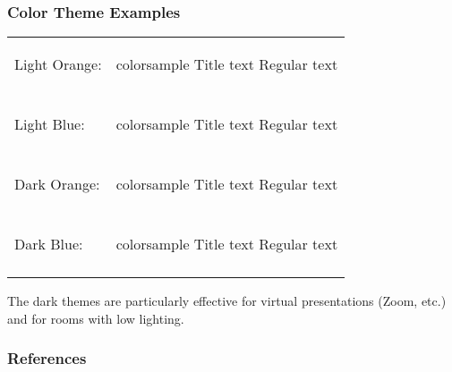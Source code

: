 \documentclass[10pt, aspectratio=169]{oden_beamer}
\begin{document}
\begin{frame} %
\frametitle{Color Theme Examples}

\begin{center}
\begin{tabular}{lr}
    Light Orange: &
        \setbeamercolor{colorsample}{bg=white,fg=charcoal}
        \begin{beamercolorbox}[wd=5cm,ht=.5cm,dp=.25cm,center]{colorsample}
            \textcolor{burnt_orange}{Title text} Regular text
        \end{beamercolorbox}
    \\ \\
    Light Blue: &
        \setbeamercolor{colorsample}{bg=white,fg=charcoal}
        \begin{beamercolorbox}[wd=5cm,ht=.5cm,dp=.25cm,center]{colorsample}
            \textcolor{oden_blue_dark}{Title text} Regular text
        \end{beamercolorbox}
    \\ \\
    Dark Orange: &
        \setbeamercolor{colorsample}{bg=charcoal,fg=chalk}
        \begin{beamercolorbox}[wd=5cm,ht=.5cm,dp=.25cm,center]{colorsample}
            \textcolor{accent_orange}{Title text} Regular text
        \end{beamercolorbox}
    \\ \\
    Dark Blue: &
        \setbeamercolor{colorsample}{bg=charcoal,fg=chalk}
        \begin{beamercolorbox}[wd=5cm,ht=.5cm,dp=.25cm,center]{colorsample}
            \textcolor{oden_blue}{Title text} Regular text
        \end{beamercolorbox}
    \\ \\
\end{tabular}
\end{center}

The dark themes are particularly effective for virtual presentations (Zoom, etc.) and for rooms with low lighting.
\end{frame}

\begin{frame}[allowframebreaks]
    \frametitle{References}
    
    
\end{frame}
\end{document}
